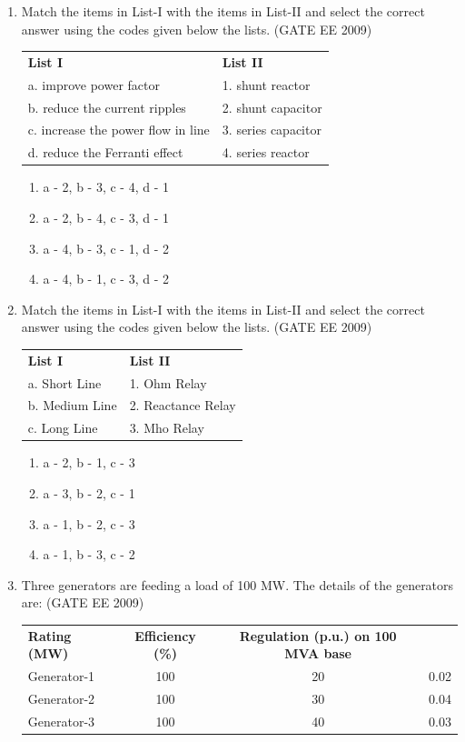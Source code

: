 \documentclass[journal,12pt,onecolumn]{IEEEtran}
\theoremstyle{remark}
\begin{document}
\begin{flushleft}
\begin{enumerate}
\item Match the items in List-I with the items in List-II and select the correct answer using the codes given below the lists.
\hfill(GATE EE 2009)
\begin{tabular}{ll}
\textbf{List I} & \textbf{List II}\\
a. improve power factor & 1. shunt reactor \\
b. reduce the current ripples & 2. shunt capacitor \\
c. increase the power flow in line & 3. series capacitor \\
d. reduce the Ferranti effect & 4. series reactor \\
\end{tabular}



\begin{enumerate}
    \item a - 2, b - 3, c - 4, d - 1
    \item a - 2, b - 4, c - 3, d - 1
    \item a - 4, b - 3, c - 1, d - 2
    \item a - 4, b - 1, c - 3, d - 2
\end{enumerate}


\item Match the items in List-I with the items in List-II and select the correct answer using the codes given below the lists.
\hfill(GATE EE 2009)
\begin{tabular}{ll}
\textbf{List I} & \textbf{List II}\\
a. Short Line & 1. Ohm Relay \\
b. Medium Line & 2. Reactance Relay \\
c. Long Line & 3. Mho Relay \\
\end{tabular}



\begin{enumerate}
    \item a - 2, b - 1, c - 3
    \item a - 3, b - 2, c - 1
    \item a - 1, b - 2, c - 3
    \item a - 1, b - 3, c - 2
\end{enumerate}


\item Three generators are feeding a load of 100 MW. The details of the generators are:
\hfill(GATE EE 2009)
\begin{tabular}{lccc}
\textbf{Rating (MW)} & \textbf{Efficiency (\%)} & \textbf{Regulation (p.u.) on 100 MVA base} \\
Generator-1 & 100 & 20 & 0.02 \\
Generator-2 & 100 & 30 & 0.04 \\
Generator-3 & 100 & 40 & 0.03 \\
\end{tabular}




\end{enumerate}
\end{flushleft}
\end{document}
